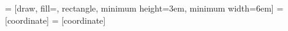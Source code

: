 

\newcommand{\spcb}{5.0cm} %
\newcommand{\sled}{0.1cm} %
\newcommand{\smic}{0.6cm} %
\newcommand{\boxh}{2.0cm} %
\newcommand{\boxw}{4.0cm} %

\newcommand{\rmic}{2.4cm} %
\newcommand{\rled}{1.8cm} %

\newcommand{\dw}{0.5cm} %
\newcommand{\daled}{-90} %
\newcommand{\damic}{90} %

\newcommand{\xl}{-7.0cm}
\newcommand{\xm}{0.0cm}
\newcommand{\xr}{7.0cm}

\newcommand{\yt}{5.0cm}
\newcommand{\yb}{0.0cm}




	
	
	 = [draw, fill=\blueFill, rectangle, 
	minimum height=3em, minimum width=6em]
	 = [coordinate]
	 = [coordinate]
	

